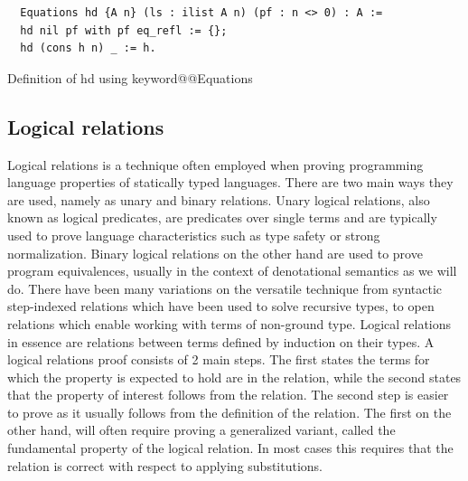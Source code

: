 \documentclass[11pt, final]{article}
\makeatletter
\def\<#1>{\csname keyword@@#1\endcsname}
\makeatother
\begin{document}
\begin{listing}
  \begin{verbatim}
  Equations hd {A n} (ls : ilist A n) (pf : n <> 0) : A :=
  hd nil pf with pf eq_refl := {};
  hd (cons h n) _ := h.
  \end{verbatim}
  \caption{Definition of hd using \<Equations>}
  \label{lst:dt_ilist_hd_equations}
\end{listing}


\subsection{Logical relations}

Logical relations is a technique often employed when proving programming language properties of statically typed languages\cite{skorstengaard2019introduction}. There are two main ways they are used, namely as unary and binary relations.
Unary logical relations, also known as logical predicates, are predicates over single terms and are typically used to prove language characteristics such as type safety or strong normalization.
Binary logical relations on the other hand are used to prove program equivalences, usually in the context of denotational semantics as we will do.
There have been many variations on the versatile technique from syntactic step-indexed relations which have been used to solve recursive types\cite{Ahmed2006}, to open relations which enable working with terms of non-ground type\cite{barthe2020versatility}\cite{huot2020correctness}.
Logical relations in essence are relations between terms defined by induction on their types.
A logical relations proof consists of 2 main steps.
The first states the terms for which the property is expected to hold are in the relation, while the second states that the property of interest follows from the relation.
The second step is easier to prove as it usually follows from the definition of the relation. The first on the other hand, will often require proving a generalized variant, called the fundamental property of the logical relation.
In most cases this requires that the relation is correct with respect to applying substitutions.
\end{document}
